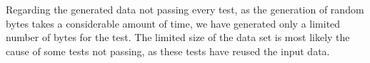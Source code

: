 Regarding the generated data not passing every test, as the generation of random bytes takes a considerable amount of time, we have generated only a limited number of bytes for the test. The limited size of the data set is most likely the cause of some tests not passing, as these tests have reused the input data.









